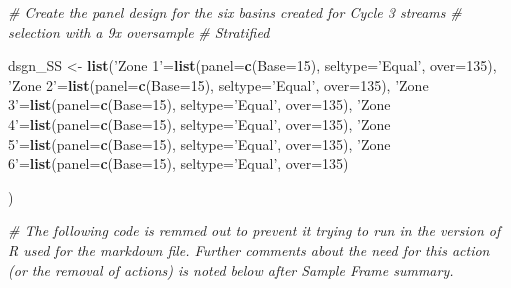 \documentclass[
]{article}
\newenvironment{Shaded}{\begin{snugshade}}{\end{snugshade}}
\newcommand{\CommentTok}[1]{\textcolor[rgb]{0.56,0.35,0.01}{\textit{#1}}}
\newcommand{\DataTypeTok}[1]{\textcolor[rgb]{0.13,0.29,0.53}{#1}}
\newcommand{\DecValTok}[1]{\textcolor[rgb]{0.00,0.00,0.81}{#1}}
\newcommand{\KeywordTok}[1]{\textcolor[rgb]{0.13,0.29,0.53}{\textbf{#1}}}
\newcommand{\NormalTok}[1]{#1}
\newcommand{\StringTok}[1]{\textcolor[rgb]{0.31,0.60,0.02}{#1}}
\begin{document}
\begin{Shaded}
\begin{Highlighting}[]
\CommentTok{# Create the panel design for the six basins created for Cycle 3 streams }
\CommentTok{# selection with a 9x oversample}
\CommentTok{# Stratified           }

\NormalTok{dsgn_SS <-}\StringTok{ }\KeywordTok{list}\NormalTok{(}\StringTok{'Zone 1'}\NormalTok{=}\KeywordTok{list}\NormalTok{(}\DataTypeTok{panel=}\KeywordTok{c}\NormalTok{(}\DataTypeTok{Base=}\DecValTok{15}\NormalTok{),}
                              \DataTypeTok{seltype=}\StringTok{'Equal'}\NormalTok{,}
                              \DataTypeTok{over=}\DecValTok{135}\NormalTok{), }
                \StringTok{'Zone 2'}\NormalTok{=}\KeywordTok{list}\NormalTok{(}\DataTypeTok{panel=}\KeywordTok{c}\NormalTok{(}\DataTypeTok{Base=}\DecValTok{15}\NormalTok{),}
                              \DataTypeTok{seltype=}\StringTok{'Equal'}\NormalTok{,}
                              \DataTypeTok{over=}\DecValTok{135}\NormalTok{),}
                \StringTok{'Zone 3'}\NormalTok{=}\KeywordTok{list}\NormalTok{(}\DataTypeTok{panel=}\KeywordTok{c}\NormalTok{(}\DataTypeTok{Base=}\DecValTok{15}\NormalTok{),}
                              \DataTypeTok{seltype=}\StringTok{'Equal'}\NormalTok{,}
                              \DataTypeTok{over=}\DecValTok{135}\NormalTok{),}
                \StringTok{'Zone 4'}\NormalTok{=}\KeywordTok{list}\NormalTok{(}\DataTypeTok{panel=}\KeywordTok{c}\NormalTok{(}\DataTypeTok{Base=}\DecValTok{15}\NormalTok{),}
                              \DataTypeTok{seltype=}\StringTok{'Equal'}\NormalTok{,}
                              \DataTypeTok{over=}\DecValTok{135}\NormalTok{),}
                \StringTok{'Zone 5'}\NormalTok{=}\KeywordTok{list}\NormalTok{(}\DataTypeTok{panel=}\KeywordTok{c}\NormalTok{(}\DataTypeTok{Base=}\DecValTok{15}\NormalTok{),}
                              \DataTypeTok{seltype=}\StringTok{'Equal'}\NormalTok{,}
                              \DataTypeTok{over=}\DecValTok{135}\NormalTok{),        }
                \StringTok{'Zone 6'}\NormalTok{=}\KeywordTok{list}\NormalTok{(}\DataTypeTok{panel=}\KeywordTok{c}\NormalTok{(}\DataTypeTok{Base=}\DecValTok{15}\NormalTok{),}
                              \DataTypeTok{seltype=}\StringTok{'Equal'}\NormalTok{,}
                              \DataTypeTok{over=}\DecValTok{135}\NormalTok{)}
                
\NormalTok{)}

\CommentTok{# The following code is remmed out to prevent it trying to run in the version of R used for the markdown file.  Further comments about the need for this action (or the removal of actions) is noted below after Sample Frame summary.}


\end{Highlighting}
\end{Shaded}
\end{document}
